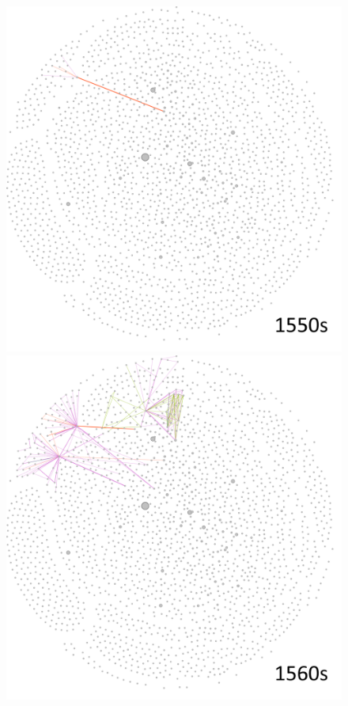 \documentclass[12pt,a4paper,oneside]{book}
\begin{document}
\begin{sloppypar}
\begin{figure}[H]
\centering
\includegraphics[scale=0.4]{graph/People_1550s.png}
\includegraphics[scale=0.4]{graph/People_1560s.png}

\end{figure}
\end{sloppypar}
\end{document}
